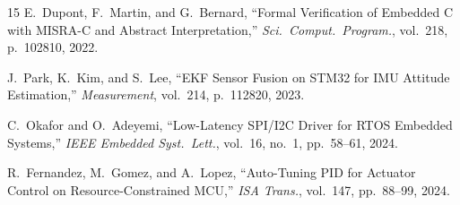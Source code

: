 \documentclass[12pt,a4paper]{article}
\begin{document}
\begin{thebibliography}{15}
E.~Dupont, F.~Martin, and G.~Bernard,
``Formal Verification of Embedded C with MISRA-C and Abstract
Interpretation,''
\textit{Sci.\ Comput.\ Program.}, vol.~218, p.~102810, 2022.

J.~Park, K.~Kim, and S.~Lee,
``EKF Sensor Fusion on STM32 for IMU Attitude Estimation,''
\textit{Measurement}, vol.~214, p.~112820, 2023.

C.~Okafor and O.~Adeyemi,
``Low-Latency SPI/I2C Driver for RTOS Embedded Systems,''
\textit{IEEE Embedded Syst.\ Lett.}, vol.~16, no.~1,
pp.~58--61, 2024.

R.~Fernandez, M.~Gomez, and A.~Lopez,
``Auto-Tuning PID for Actuator Control on Resource-Constrained
MCU,''
\textit{ISA Trans.}, vol.~147, pp.~88--99, 2024.

\end{thebibliography}
\end{document}
